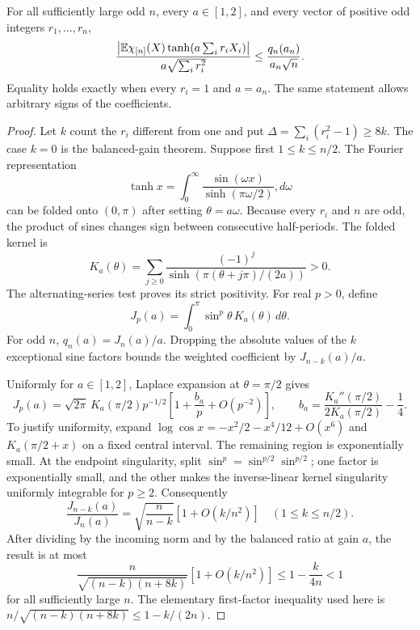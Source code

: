 \begin{theorem}
\label{thm:all-harmonics}
For all sufficiently large odd $n$, every $a\in[1,2]$, and every
vector of positive odd integers $r_1,\ldots,r_n$,
\[
 \frac{\left|\mathbb E\chi_{[n]}(X)
       \tanh(a\sum_i r_iX_i)\right|}
 {a\sqrt{\sum_i r_i^2}}
 \le\frac{q_n(a_n)}{a_n\sqrt n}.
\]
Equality holds exactly when every $r_i=1$ and $a=a_n$.
The same statement allows arbitrary signs of the coefficients.
\end{theorem}
\begin{proof}
Let $k$ count the $r_i$ different from one and put
$\Delta=\sum_i(r_i^2-1)\ge8k$. The case $k=0$ is the balanced-gain
 theorem. Suppose first $1\le k\le n/2$.
The Fourier representation
\[
 \tanh x=\int_0^\infty\frac{\sin(\omega x)}{\sinh(\pi\omega/2)},d\omega
\]
can be folded onto $(0,\pi)$ after setting $\theta=a\omega$.
Because every $r_i$ and $n$ are odd, the product of sines changes sign
between consecutive half-periods. The folded kernel is
\[
 K_a(\theta)=\sum_{j\ge0}\frac{(-1)^j}
 {\sinh(\pi(\theta+j\pi)/(2a))}>0.
\]
The alternating-series test proves its strict positivity. For real
$p>0$, define
\[
 J_p(a)=\int_0^\pi\sin^p\theta\,K_a(\theta)\,d\theta.
\]
For odd $n$, $q_n(a)=J_n(a)/a$. Dropping the absolute values of the
$k$ exceptional sine factors bounds the weighted coefficient by
$J_{n-k}(a)/a$.

Uniformly for $a\in[1,2]$, Laplace expansion at $\theta=\pi/2$ gives
\begin{equation}\label{eq:folded-laplace}
 J_p(a)=\sqrt{2\pi}\,K_a(\pi/2)p^{-1/2}
 \left[1+\frac{b_a}{p}+O(p^{-2})\right],\qquad
 b_a=\frac{K_a''(\pi/2)}{2K_a(\pi/2)}-\frac14.
\end{equation}
To justify uniformity, expand $\log\cos x=-x^2/2-x^4/12+O(x^6)$
and $K_a(\pi/2+x)$ on a fixed central interval. The remaining region
is exponentially small. At the endpoint singularity, split
$\sin^p=\sin^{p/2}\sin^{p/2}$; one factor is exponentially small,
and the other makes the inverse-linear kernel singularity uniformly
integrable for $p\ge2$.
Consequently
\[
 \frac{J_{n-k}(a)}{J_n(a)}
 =\sqrt{\frac n{n-k}}\left[1+O(k/n^2)\right]
 \quad(1\le k\le n/2).
\]
After dividing by the incoming norm and by the balanced ratio at gain
$a$, the result is at most
\[
 \frac n{\sqrt{(n-k)(n+8k)}}[1+O(k/n^2)]
 \le1-\frac{k}{4n}<1
\]
for all sufficiently large $n$. The elementary first-factor inequality
used here is $n/\sqrt{(n-k)(n+8k)}\le1-k/(2n)$.


\end{proof}
